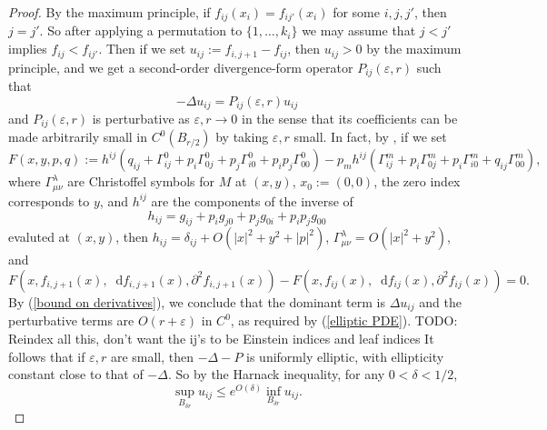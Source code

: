 \documentclass[reqno,11pt]{amsart}
\newcommand*\dif{\mathop{}\!\mathrm{d}}
\theoremstyle{definition}
\numberwithin{equation}{section}
\begin{document}
\begin{proof}
By the maximum principle, if $f_{ij}(x_i) = f_{ij'}(x_i)$ for some $i, j, j'$, then $j = j'$.
So after applying a permutation to $\{1, \dots, k_i\}$ we may assume that $j < j'$ implies $f_{ij} < f_{ij'}$.
Then if we set $u_{ij} := f_{i,j+1} - f_{ij}$, then $u_{ij} > 0$ by the maximum principle, and we get a second-order divergence-form operator $P_{ij}(\varepsilon, r)$ such that
\begin{equation}\label{elliptic PDE}
-\Delta u_{ij} = P_{ij}(\varepsilon, r) u_{ij}
\end{equation}
and $P_{ij}(\varepsilon, r)$ is perturbative as $\varepsilon, r \to 0$ in the sense that its coefficients can be made arbitrarily small in $C^0(B_{r/2})$ by taking $\varepsilon, r$ small.
In fact, by \cite[Chapter 7]{colding2011course}, if we set
$$F(x, y, p, q) := h^{ij} (q_{ij} + \Gamma_{ij}^0 + p_i \Gamma_{0j}^0 + p_j \Gamma^0_{i0} + p_i p_j \Gamma^0_{00}) - p_m h^{ij} (\Gamma_{ij}^m + p_i \Gamma_{0j}^m + p_i \Gamma_{i0}^m + q_{ij} \Gamma_{00}^m),$$
where $\Gamma_{\mu \nu}^\lambda$ are Christoffel symbols for $M$ at $(x, y)$, $x_0 := (0, 0)$, the zero index corresponds to $y$, and $h^{ij}$ are the components of the inverse of
$$h_{ij} = g_{ij} + p_i g_{j0} + p_j g_{0i} + p_i p_j g_{00}$$
evaluted at $(x, y)$, then $h_{ij} = \delta_{ij} + O(|x|^2 + y^2 + |p|^2)$, $\Gamma_{\mu \nu}^\lambda = O(|x|^2 + y^2)$, and
$$F(x, f_{i, j + 1}(x), \dif f_{i, j + 1}(x), \partial^2 f_{i, j + 1}(x)) - F(x, f_{ij}(x), \dif f_{ij}(x), \partial^2 f_{ij}(x)) = 0.$$
By (\ref{bound on derivatives}), we conclude that the dominant term is $\Delta u_{ij}$ and the perturbative terms are $O(r + \varepsilon)$ in $C^0$, as required by (\ref{elliptic PDE}).
TODO: Reindex all this, don't want the ij's to be Einstein indices and leaf indices
It follows that if $\varepsilon, r$ are small, then $-\Delta - P$ is uniformly elliptic, with ellipticity constant close to that of $-\Delta$.
So by the Harnack inequality, for any $0 < \delta < 1/2$,
\begin{equation}\label{Harnack bound}
\sup_{B_{\delta r}} u_{ij} \leq e^{O(\delta)} \inf_{B_{\delta r}} u_{ij}.
\end{equation}


\end{proof}
\end{document}
